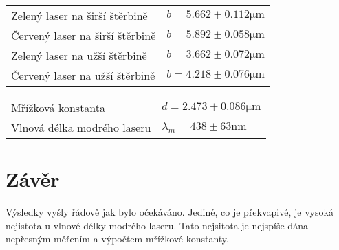 \documentclass[a4paper,10pt]{article}
\begin{document}
\begin{tabular}{l l}
 Zelený laser na širší štěrbině & $b = 5.662 \pm 0.112 \si{\micro\meter}$\\
 Červený laser na širší štěrbině & $b = 5.892 \pm 0.058 \si{\micro\meter}$\\
 Zelený laser na užší štěrbině & $b = 3.662 \pm 0.072 \si{\micro\meter}$\\
 Červený laser na užší štěrbině & $b = 4.218 \pm 0.076 \si{\micro\meter}$
\end{tabular}

\textbf{ }

\begin{tabular}{l l}
 Mřížková konstanta & $d = 2.473 \pm 0.086 \si{\micro\meter}$\\
 Vlnová délka modrého laseru & $\lambda_m = 438 \pm 63 \si{\nano\meter}$
\end{tabular}

\section{Závěr}
Výsledky vyšly řádově jak bylo očekáváno. Jediné, co je překvapivé, je vysoká nejistota u vlnové délky modrého laseru. Tato nejsitota je nejspíše dána nepřesným měřením a výpočtem mřížkové konstanty.
\end{document}
